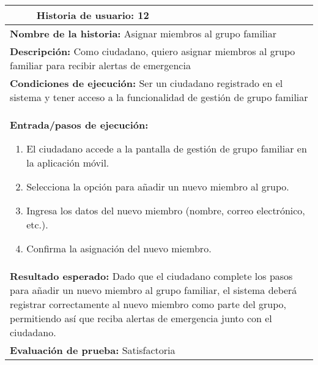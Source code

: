 \begin{longtable}{|p{6.7cm}|p{6.7cm}|}
    \hline
    \endlastfoot
    \multicolumn{1}{|p{6.7cm}|}{\textbf{Número} 12 } & \multicolumn{1}{|p{6.7cm}|}{\textbf{Historia de usuario:} 12}                                                                                                                                                                                              \\
    \hline
    \multicolumn{2}{|p{13.4cm}|}{\textbf{Nombre de la historia:} Asignar miembros al grupo familiar }                                                                                                                                                                                                             \\
    \hline
    \multicolumn{2}{|p{13.4cm}|}{\textbf{Descripción:} Como ciudadano, quiero asignar miembros al grupo familiar para recibir alertas de emergencia}                                                                                                                                                              \\
    \hline
    \multicolumn{2}{|p{13.4cm}|}{\textbf{Condiciones de ejecución:} Ser un ciudadano registrado en el sistema y tener acceso a la funcionalidad de gestión de grupo familiar}                                                                                                                                     \\
    \hline
    \multicolumn{2}{|p{13.4cm}|}{\textbf{Entrada/pasos de ejecución:}
    \begin{enumerate}[label=\arabic*.]
        \item El ciudadano accede a la pantalla de gestión de grupo familiar en la aplicación móvil.
        \item Selecciona la opción para añadir un nuevo miembro al grupo.
        \item Ingresa los datos del nuevo miembro (nombre, correo electrónico, etc.).
        \item Confirma la asignación del nuevo miembro.
    \end{enumerate}
    }                                                                                                                                                                                                                                                                                                             \\
    \hline
    \multicolumn{2}{|p{13.4cm}|}{\textbf{Resultado esperado:} Dado que el ciudadano complete los pasos para añadir un nuevo miembro al grupo familiar, el sistema deberá registrar correctamente al nuevo miembro como parte del grupo, permitiendo así que reciba alertas de emergencia junto con el ciudadano.} \\
    \hline
    \multicolumn{2}{|p{13.4cm}|}{\textbf{Evaluación de prueba:} Satisfactoria}                                                                                                                                                                                                                                    \\
    \hline
\end{longtable}


